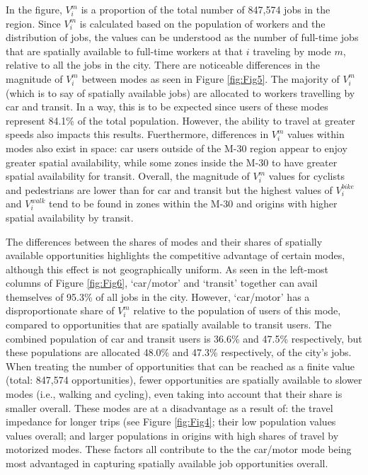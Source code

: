 \documentclass[10pt,letterpaper]{article}
\begin{document}
In the figure, \(V_i^m\) is a proportion of the total number of 847,574
jobs in the region. Since \(V_i^m\) is calculated based on the
population of workers and the distribution of jobs, the values can be
understood as the number of full-time jobs that are spatially available
to full-time workers at that \(i\) traveling by mode \(m\), relative to
all the jobs in the city. There are noticeable differences in the
magnitude of \(V_i^m\) between modes as seen in Figure \ref{fig:Fig5}.
The majority of \(V_i^m\) (which is to say of spatially available jobs)
are allocated to workers travelling by car and transit. In a way, this
is to be expected since users of these modes represent 84.1\% of the
total population. However, the ability to travel at greater speeds also
impacts this results. Fuerthermore, differences in \(V_i^m\) values
within modes also exist in space: car users outside of the M-30 region
appear to enjoy greater spatial availability, while some zones inside
the M-30 to have greater spatial availability for transit. Overall, the
magnitude of \(V_i^m\) values for cyclists and pedestrians are lower
than for car and transit but the highest values of \(V_i^{bike}\) and
\(V_i^{walk}\) tend to be found in zones within the M-30 and origins
with higher spatial availability by transit.

The differences between the shares of modes and their shares of
spatially available opportunities highlights the competitive advantage
of certain modes, although this effect is not geographically uniform. As
seen in the left-most columns of Figure \ref{fig:Fig6}, `car/motor' and
`transit' together can avail themselves of 95.3\% of all jobs in the
city. However, `car/motor' has a disproportionate share of \(V_i^m\)
relative to the population of users of this mode, compared to
opportunities that are spatially available to transit users. The
combined population of car and transit users is 36.6\% and 47.5\%
respectively, but these populations are allocated 48.0\% and 47.3\%
respectively, of the city's jobs. When treating the number of
opportunities that can be reached as a finite value (total: 847,574
opportunities), fewer opportunities are spatially available to slower
modes (i.e., walking and cycling), even taking into account that their
share is smaller overall. These modes are at a disadvantage as a result
of: the travel impedance for longer trips (see Figure \ref{fig:Fig4};
their low population values values overall; and larger populations in
origins with high shares of travel by motorized modes. These factors all
contribute to the the car/motor mode being most advantaged in capturing
spatially available job opportunities overall.
\end{document}
